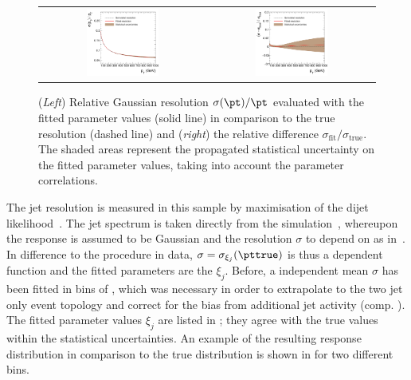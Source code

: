 \begin{figure}[ht]
  \centering
  \begin{tabular}{cc}
    \includegraphics[width=0.45\textwidth]{figures/resFit_ToyMC_PtGenCuts_Sigma} &
    \includegraphics[width=0.45\textwidth]{figures/resFit_ToyMC_PtGenCuts_SigmaRelDifference} \\
  \end{tabular}
  \caption{(\textit{Left}) Relative Gaussian resolution \mbox{$\sigma(\pt)/\pt$} evaluated with the fitted parameter values (solid line) in comparison to the true resolution (dashed line) and (\textit{right}) the relative difference \mbox{$\sigma_{\text{fit}} / \sigma_{\text{true}}$}.
    The shaded areas represent the propagated statistical uncertainty on the fitted parameter values, taking into account the parameter correlations.}
  \label{fig:ResFit:App:ToyMC:FittedSigma}
\end{figure}

The jet \pt resolution is measured in this sample by maximisation of the dijet likelihood~.
The jet \pt spectrum is taken directly from the simulation~, whereupon the response is assumed to be Gaussian and the resolution $\sigma$ to depend on \pttrue as in~.
In difference to the procedure in data, \mbox{$\sigma = \sigma_{\xi_{j}}(\pttrue)$} is thus a \pttrue dependent function and the fitted parameters are the $\xi_{j}$.
Before, a \pt independent mean $\sigma$ has been fitted in bins of \ptave, which was necessary in order to extrapolate to the two jet only event topology and correct for the bias from additional jet activity (comp. ).
The fitted parameter values $\xi_{j}$ are listed in ; they agree with the true values within the statistical uncertainties.
An example of the resulting response distribution in comparison to the true distribution is shown in  for two different \pttrue bins.

